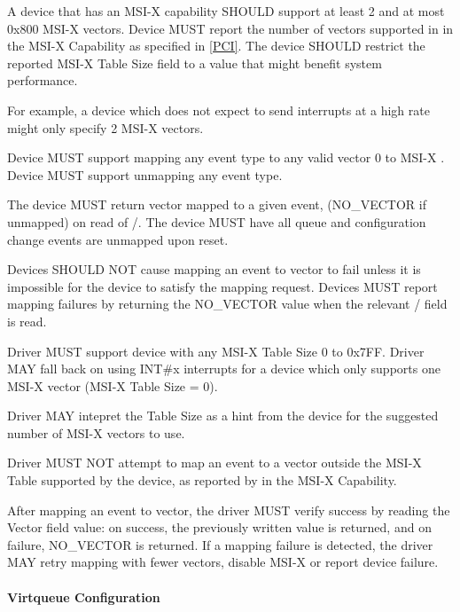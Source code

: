 A device that has an MSI-X capability SHOULD support at least 2
and at most 0x800 MSI-X vectors.
Device MUST report the number of vectors supported in
 in the MSI-X Capability as specified in
\hyperref[intro:PCI]{[PCI]}.
The device SHOULD restrict the reported MSI-X Table Size field
to a value that might benefit system performance.
\begin{note}
For example, a device which does not expect to send
interrupts at a high rate might only specify 2 MSI-X vectors.
\end{note}
Device MUST support mapping any event type to any valid
vector 0 to MSI-X .
Device MUST support unmapping any event type.

The device MUST return vector mapped to a given event,
(NO_VECTOR if unmapped) on read of /.
The device MUST have all queue and configuration change
events are unmapped upon reset.

Devices SHOULD NOT cause mapping an event to vector to fail
unless it is impossible for the device to satisfy the mapping
request.  Devices MUST report mapping
failures by returning the NO_VECTOR value when the relevant
/ field is read. 


Driver MUST support device with any MSI-X Table Size 0 to 0x7FF.
Driver MAY fall back on using INT\#x interrupts for a device
which only supports one MSI-X vector (MSI-X Table Size = 0).

Driver MAY intepret the Table Size as a hint from the device
for the suggested number of MSI-X vectors to use.

Driver MUST NOT attempt to map an event to a vector
outside the MSI-X Table supported by the device,
as reported by  in the MSI-X Capability.

After mapping an event to vector, the
driver MUST verify success by reading the Vector field value: on
success, the previously written value is returned, and on
failure, NO_VECTOR is returned. If a mapping failure is detected,
the driver MAY retry mapping with fewer vectors, disable MSI-X
or report device failure.

\paragraph{Virtqueue Configuration}\label{sec:Virtio Transport Options / Virtio Over PCI Bus / PCI-specific Initialization And Device Operation / Device Initialization / Virtqueue Configuration}

